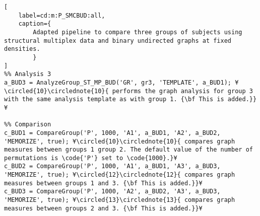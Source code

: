 \documentclass{tufte-handout}
\begin{document}
\begin{lstlisting}[
	label=cd:m:P_SMCBUD:all,
	caption={
		Adapted pipeline to compare three groups of subjects using structural multiplex data and binary undirected graphs at fixed densities.
		}
]
%% Analysis 3
a_BUD3 = AnalyzeGroup_ST_MP_BUD('GR', gr3, 'TEMPLATE', a_BUD1); ¥\circled{10}\circlednote{10}{ performs the graph analysis for group 3 with the same analysis template as with group 1. {\bf This is added.}}¥

%% Comparison
c_BUD1 = CompareGroup('P', 1000, 'A1', a_BUD1, 'A2', a_BUD2, 'MEMORIZE', true); ¥\circled{10}\circlednote{10}{ compares graph measures between groups 1 group 2. The default value of the number of permutations is \code{'P'} set to \code{1000}.}¥
c_BUD2 = CompareGroup('P', 1000, 'A1', a_BUD1, 'A3', a_BUD3, 'MEMORIZE', true); ¥\circled{12}\circlednote{12}{ compares graph measures between groups 1 and 3. {\bf This is added.}}¥
c_BUD3 = CompareGroup('P', 1000, 'A2', a_BUD2, 'A3', a_BUD3, 'MEMORIZE', true); ¥\circled{13}\circlednote{13}{ compares graph measures between groups 2 and 3. {\bf This is added.}}¥
\end{lstlisting}
\end{document}
